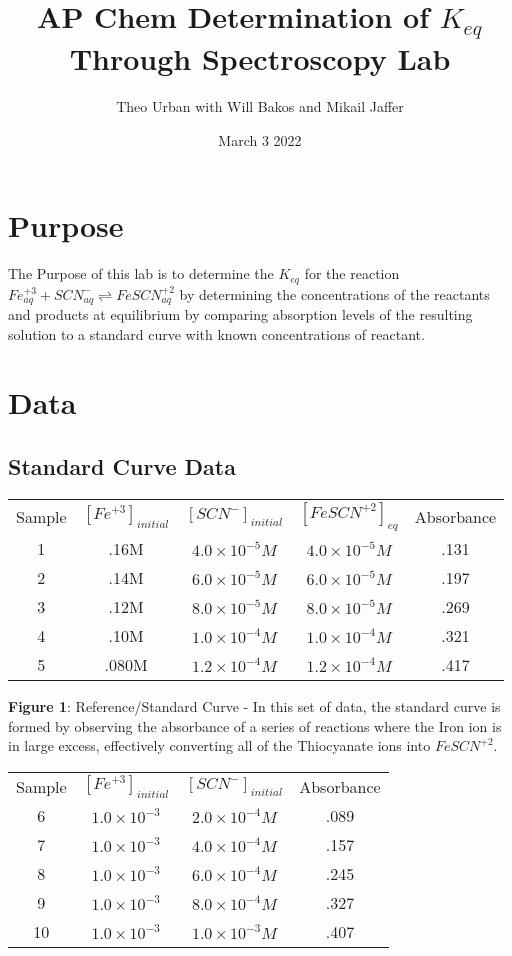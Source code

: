 \documentclass{article}
\title{AP Chem Determination of $K_{eq}$ Through Spectroscopy Lab}
\author{Theo Urban with Will Bakos and Mikail Jaffer}
\date{March 3 2022}
\begin{document}
\maketitle

\section{Purpose}
    The Purpose of this lab is to determine the $K_{eq}$ for the reaction $Fe^{+3}_{aq} + SCN^-_{aq} \rightleftharpoons FeSCN^{+2}_{aq}$ by determining the concentrations of the reactants and products at equilibrium by comparing absorption levels of the resulting solution to a standard curve with known concentrations of reactant.
\section{Data}
\subsection{Standard Curve Data}
\begin{table}[h!]
\centering
    \begin{tabular}{c|c|c|c|c}
        Sample & $[Fe^{+3}]_{initial}$ & $[SCN^-]_{initial}$ & $[FeSCN^{+2}]_{eq}$ & Absorbance \\
        1 & .16M & $4.0\times10^{-5}M$ & $4.0\times10^{-5}M$ & .131 \\
        2 & .14M & $6.0\times10^{-5}M$ & $6.0\times10^{-5}M$ & .197 \\
        3 & .12M & $8.0\times10^{-5}M$ & $8.0\times10^{-5}M$ & .269 \\
        4 & .10M & $1.0\times10^{-4}M$ & $1.0\times10^{-4}M$ & .321 \\
        5 & .080M & $1.2\times10^{-4}M$ & $1.2\times10^{-4}M$ & .417
    
    \end{tabular}
\end{table}

\centering
\textbf{Figure 1}: Reference/Standard Curve - In this set of data, the standard curve is formed by observing the absorbance of a series of reactions where the Iron ion is in large excess, effectively converting all of the Thiocyanate ions into $FeSCN^{+2}$.
$\ $ 

\begin{table}[h!]
    \centering
    \begin{tabular}{c|c|c|c}
        Sample & $[Fe^{+3}]_{initial}$ & $[SCN^-]_{initial}$ & Absorbance \\
        6 & $1.0\times10^{-3}$ & $2.0\times10^{-4}M$ & .089 \\
        7 & $1.0\times10^{-3}$ & $4.0\times10^{-4}M$ & .157 \\
        8 & $1.0\times10^{-3}$ & $6.0\times10^{-4}M$ & .245 \\
        9 & $1.0\times10^{-3}$ & $8.0\times10^{-4}M$ & .327 \\
        10 & $1.0\times10^{-3}$ & $1.0\times10^{-3}M$ & .407 
    \end{tabular}
\end{table}
\end{document}
